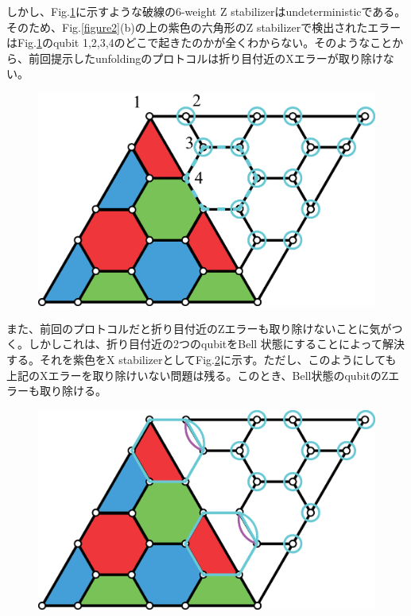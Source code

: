 \documentclass[a4paper,10pt]{ltjsarticle}
\begin{document}
{    しかし、Fig.\ref{figure3}に示すような破線の6-weight Z stabilizerはundeterministicである。そのため、Fig.\ref{figure2}(b)の上の紫色の六角形のZ stabilizerで検出されたエラーはFig.\ref{figure3}のqubit 1,2,3,4のどこで起きたのかが全くわからない。そのようなことから、前回提示したunfoldingのプロトコルは折り目付近のXエラーが取り除けない。

    \begin{figure}[h]
        \centering
        \includegraphics[scale=0.3]{figure/figure3.eps}
        \caption{ }
        \label{figure3}
    \end{figure}

    また、前回のプロトコルだと折り目付近のZエラーも取り除けないことに気がつく。しかしこれは、折り目付近の2つのqubitをBell 状態にすることによって解決する。それを紫色をX stabilizerとしてFig.\ref{figure4}に示す。ただし、このようにしても上記のXエラーを取り除けいない問題は残る。このとき、Bell状態のqubitのZエラーも取り除ける。
    
    \begin{figure}[h]
        \centering
        \includegraphics[scale=0.3]{figure/figure4.eps}
        \caption{ }
        \label{figure4}
    \end{figure}

}
\end{document}
